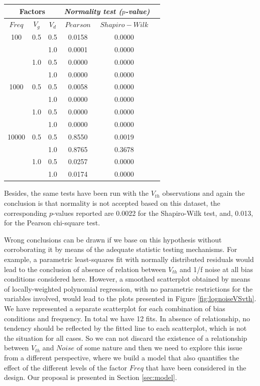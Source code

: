 \documentclass[sn-mathphys]{sn-jnl}%
\theoremstyle{thmstyleone}%
\theoremstyle{thmstyletwo}%
\theoremstyle{thmstylethree}%
\begin{document}
\begin{table}[!t]
	\centering
	\begin{tabular}{|c|c|c|c|c|c|}
		\hline
		\multicolumn{3}{|c|}{Factors}&\multicolumn{2}{c|}{{\it Normality test ($p$-value)}} \\ \hline
		$Freq$ & $V_g$ & $V_d$ & $Pearson$ & $Shapiro-Wilk$ \\ 
		\hline
		100   & 0.5 & 0.5 & 0.0158 & 0.0000 \\ 
		&     & 1.0 & 0.0001 & 0.0000 \\ 
		& 1.0 & 0.5 & 0.0000 & 0.0000 \\ 
		&     & 1.0 & 0.0000 & 0.0000 \\ 
		1000  & 0.5 & 0.5 & 0.0058 & 0.0000 \\ 
		&     & 1.0 & 0.0000 & 0.0000 \\ 
		& 1.0 & 0.5 & 0.0000 & 0.0000 \\ 
		&     & 1.0 & 0.0000 & 0.0000 \\ 
		10000 & 0.5 & 0.5 & 0.8550 & 0.0019 \\ 
		&     & 1.0 & 0.8765 & 0.3678 \\ 
		& 1.0 & 0.5 & 0.0257 & 0.0000\\ 
		&     & 1.0 & 0.0174 & 0.0000\\ 
		\hline
	\end{tabular}
\end{table}

Besides, the same tests have been run with the $V_{th}$ observations and again the conclusion is that normality is not accepted based on this dataset, the corresponding $p$-values reported are  0.0022 for the Shapiro-Wilk test, and, 0.013, for the Pearson chi-square test.

Wrong conclusions can be drawn if we base on this hypothesis without corroborating it by means of the adequate statistic testing mechanisms.
For example, a parametric least-squares fit with normally distributed residuals would lead to the conclusion of absence of relation between $V_{th}$ and 1/f noise at all bias conditions considered here. However, a smoothed scatterplot obtained by means of locally-weighted polynomial regression, with no parametric restrictions for the variables involved, would lead to the plots presented in Figure \ref{fig:lognoiseVSvth}. We have represented a separate scatterplot for each combination of bias conditions and frequency. In total we have 12 fits. In absence of relationship, no tendency should be reflected by the fitted line to each scatterplot, which is not the situation for all cases. So we can not discard the existence of a relationship between $V_{th}$ and $Noise$ of some nature and then we need to explore this issue from a different perspective, where we build a model that also quantifies the effect of the different levels of the factor $Freq$ that have been considered in the design. Our proposal is presented in Section \ref{sec:model}.
\end{document}
